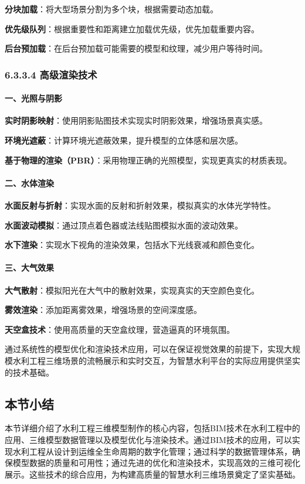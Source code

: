 \textbf{分块加载}：将大型场景分割为多个块，根据需要动态加载。

\textbf{优先级队列}：根据重要性和距离建立加载优先级，优先加载重要内容。

\textbf{后台预加载}：在后台预加载可能需要的模型和纹理，减少用户等待时间。

\subsubsection{6.3.3.4
高级渲染技术}\label{ux9ad8ux7ea7ux6e32ux67d3ux6280ux672f}

\paragraph{一、光照与阴影}\label{ux4e00ux5149ux7167ux4e0eux9634ux5f71}

\textbf{实时阴影映射}：使用阴影贴图技术实现实时阴影效果，增强场景真实感。

\textbf{环境光遮蔽}：计算环境光遮蔽效果，提升模型的立体感和层次感。

\textbf{基于物理的渲染（PBR）}：采用物理正确的光照模型，实现更真实的材质表现。

\paragraph{二、水体渲染}\label{ux4e8cux6c34ux4f53ux6e32ux67d3}

\textbf{水面反射与折射}：实现水面的反射和折射效果，模拟真实的水体光学特性。

\textbf{水面波动模拟}：通过顶点着色器或法线贴图模拟水面的波动效果。

\textbf{水下渲染}：实现水下视角的渲染效果，包括水下光线衰减和颜色变化。

\paragraph{三、大气效果}\label{ux4e09ux5927ux6c14ux6548ux679c}

\textbf{大气散射}：模拟阳光在大气中的散射效果，实现真实的天空颜色变化。

\textbf{雾效渲染}：添加距离雾效果，增强场景的空间深度感。

\textbf{天空盒技术}：使用高质量的天空盒纹理，营造逼真的环境氛围。

通过系统性的模型优化和渲染技术应用，可以在保证视觉效果的前提下，实现大规模水利工程三维场景的流畅展示和实时交互，为智慧水利平台的实际应用提供坚实的技术基础。

\subsection{本节小结}\label{ux672cux8282ux5c0fux7ed3}

本节详细介绍了水利工程三维模型制作的核心内容，包括BIM技术在水利工程中的应用、三维模型数据管理以及模型优化与渲染技术。通过BIM技术的应用，可以实现水利工程从设计到运维全生命周期的数字化管理；通过科学的数据管理体系，确保模型数据的质量和可用性；通过先进的优化和渲染技术，实现高效的三维可视化展示。这些技术的综合应用，为构建高质量的智慧水利三维场景奠定了坚实基础。

